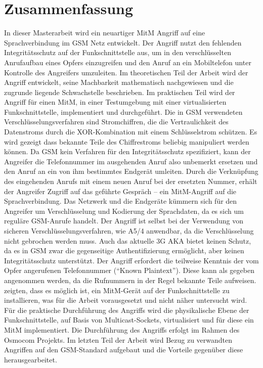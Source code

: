 \section*{Zusammenfassung}
\begin{spacing}{1.2}
In dieser Masterarbeit wird ein neuartiger \ac{MitM} Angriff auf eine Sprachverbindung im \ac{GSM} Netz entwickelt. Der Angriff nutzt den fehlenden Integritätsschutz auf der Funkschnittstelle aus, um in den verschlüsselten Anrufaufbau eines Opfers einzugreifen und den Anruf an ein Mobiltelefon unter Kontrolle des Angreifers umzuleiten. Im theoretischen Teil der Arbeit wird der Angriff entwickelt, seine Machbarkeit mathematisch nachgewiesen und die zugrunde liegende Schwachstelle beschrieben. Im praktischen Teil wird der Angriff für einen \ac{MitM}, in einer Testumgebung mit einer virtualisierten Funkschnittstelle, implementiert und durchgeführt. Die in \ac{GSM} verwendeten Verschlüsselungsverfahren sind Stromchiffren, die die Vertraulichkeit des Datenstroms durch die \ac{XOR}-Kombination mit einem Schlüsselstrom schützen. Es wird gezeigt dass bekannte Teile des Chiffrestroms beliebig manipuliert werden können. Da \ac{GSM} kein Verfahren für den Integritätsschutz spezifiziert, kann der Angreifer die Telefonnummer im ausgehenden Anruf also unbemerkt ersetzen und den Anruf an ein von ihm bestimmtes Endgerät umleiten. Durch die Verknüpfung des eingehenden Anrufs mit einem neuen Anruf bei der ersetzten Nummer, erhält der Angreifer Zugriff auf das geführte Gespräch -- ein \ac{MitM}-Angriff auf die Sprachverbindung. Das Netzwerk und die Endgeräte kümmern sich für den Angreifer um Verschlüsselung und Kodierung der Sprachdaten, da es sich um reguläre \ac{GSM}-Anrufe handelt. Der Angriff ist selbst bei der Verwendung von sicheren Verschlüsselungsverfahren, wie A5/4 anwendbar, da die Verschlüsselung nicht gebrochen werden muss. Auch das aktuelle 3G \ac{AKA} bietet keinen Schutz, da es in \ac{GSM} zwar die gegenseitige Authentifizierung ermöglicht, aber keinen Integritätsschutz unterstützt. Der Angriff erfordert die teilweise Kenntnis der vom Opfer angerufenen Telefonnummer ("`Known Plaintext"'). Diese kann als gegeben angenommen werden, da die Rufnummern in der Regel bekannte Teile aufweisen. \citet{meyer2004man} zeigten, dass es möglich ist, ein \ac{MitM}-Gerät auf der Funkschnittstelle zu installieren, was für die Arbeit vorausgesetzt und nicht näher untersucht wird. Für die praktische Durchführung des Angriffs wird die physikalische Ebene der Funkschnittstelle, auf Basis von Multicast-Sockets, virtualisiert und für diese ein \ac{MitM} implementiert. Die Durchführung des Angriffs erfolgt im Rahmen des Osmocom Projekts. Im letzten Teil der Arbeit wird Bezug zu verwandten Angriffen auf den \ac{GSM}-Standard aufgebaut und die Vorteile gegenüber diese herausgearbeitet.
\end{spacing}
\vfill
\acresetall